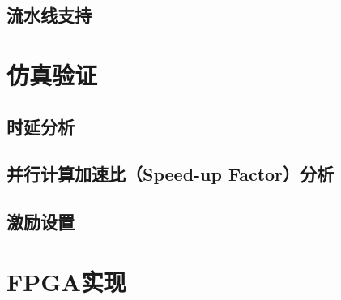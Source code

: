 \documentclass[lang=cn,a4paper,newtx]{elegantpaper}
\begin{document}
\subsection{流水线支持}









\section{仿真验证}
\subsection{时延分析}
\subsection{并行计算加速比（Speed-up Factor）分析}
\subsection{激励设置}

\section{FPGA实现}
\end{document}
